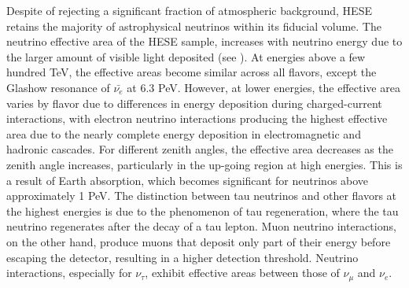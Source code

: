 Despite of rejecting a significant fraction of atmospheric background, HESE retains the majority of astrophysical neutrinos within its fiducial volume. The neutrino effective area of the HESE sample, increases with neutrino energy due to the larger amount of visible light deposited (see ). At energies above a few hundred TeV, the effective areas become similar across all flavors, except the Glashow resonance of $\bar{\nu_e}$ at 6.3 PeV. However, at lower energies, the effective area varies by flavor due to differences in energy deposition during charged-current interactions, with electron neutrino interactions producing the highest effective area due to the nearly complete energy deposition in electromagnetic and hadronic cascades. For different zenith angles, the effective area decreases as the zenith angle increases, particularly in the up-going region at high energies. This is a result of Earth absorption, which becomes significant for neutrinos above approximately 1 PeV. The distinction between tau neutrinos and other flavors at the highest energies is due to the phenomenon of tau regeneration, where the tau neutrino regenerates after the decay of a tau lepton. Muon neutrino interactions, on the other hand, produce muons that deposit only part of their energy before escaping the detector, resulting in a higher detection threshold. Neutrino interactions, especially for $\nu_\tau$, exhibit effective areas between those of $\nu_\mu$ and $\nu_e$.

